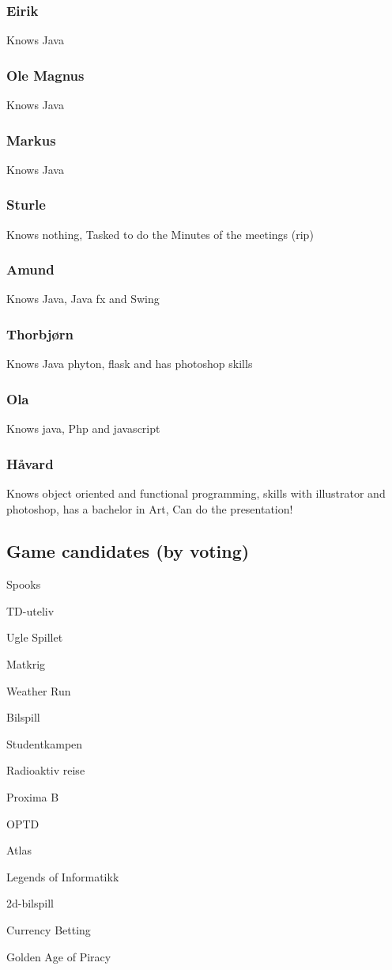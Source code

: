 \documentclass[11pt]{meetingmins}
\begin{document}
\subsubsection{Eirik}
Knows Java

\subsubsection{Ole Magnus}
Knows Java

\subsubsection{Markus}
Knows Java

\subsubsection{Sturle}
Knows nothing, Tasked to do the Minutes of the meetings (rip)

\subsubsection{Amund}
Knows Java, Java fx and Swing

\subsubsection{Thorbj\o rn}
Knows Java phyton, flask and has photoshop skills

\subsubsection{Ola}
Knows java, Php and javascript

\subsubsection{H\aa vard}
Knows object oriented and functional programming, skills with illustrator and photoshop, has a bachelor in Art, Can do the presentation!  

\subsection{Game candidates (by voting)}
\begin{items}
\item
Spooks
\item
TD-uteliv
\item
Ugle Spillet
\item
Matkrig
\item
Weather Run
\item
Bilspill
\item
Studentkampen
\item
Radioaktiv reise
\item
Proxima B
\item
OPTD
\item
Atlas
\item
Legends of Informatikk
\item
2d-bilspill
\item
Currency Betting
\item
Golden Age of Piracy
\end{items}
\end{document}

